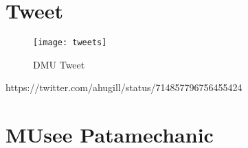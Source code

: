 \section{Tweet}

\begin{figure}[!htbp]
  \centering
  \texttt{[image: tweets]}
\caption[DMU Tweet]{DMU Tweet}
\label{fig:tweet}
\end{figure}

https://twitter.com/ahugill/status/714857796756455424




\section{MUsee Patamechanic}







\stopcontents[chapters]
